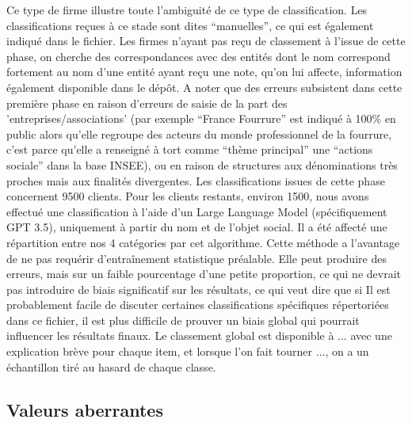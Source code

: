 \documentclass[a4paper,12pt]{article}
\begin{document}
 Ce type de firme illustre toute l'ambiguité de ce type de classification.  Les classifications re\c cues à ce stade sont dites ``manuelles'', ce qui est également indiqué dans le fichier. Les firmes n'ayant pas re\c cu de classement à l'issue de cette phase, on cherche des correspondances avec des entités dont le nom correspond fortement au nom d'une entité ayant re\c cu une note, qu'on lui affecte, information également disponible dans le dép\^ot. A noter que des erreurs subsistent dans cette première phase en raison d'erreurs de saisie de la part des 'entreprises/associations' (par exemple “France Fourrure” est indiqué à 100\% en public alors qu’elle regroupe des acteurs du monde professionnel de la fourrure, c’est parce qu’elle a renseigné à tort comme “thème principal” une “actions sociale” dans la base INSEE), ou en raison de structures aux dénominations très proches mais aux finalités divergentes.
 Les classifications issues de cette phase concernent 9500 clients. Pour les clients restants, environ 1500,  nous avons effectué une classification à l'aide d'un Large Language Model (spécifiquement GPT 3.5), uniquement à partir du nom et de l'objet social. Il a été affecté une répartition entre nos 4 catégories par cet algorithme. Cette méthode  a l'avantage de ne pas requérir d'entra\^inement statistique préalable. Elle peut produire des erreurs, mais sur un faible pourcentage d'une petite proportion, ce qui ne devrait pas introduire de biais significatif sur les résultats, ce qui veut dire que si Il est probablement facile de discuter certaines classifications spécifiques répertoriées dans ce fichier,  il est plus difficile de prouver un biais global qui pourrait influencer les résultats finaux. 
 Le classement global est disponible à ... avec une explication brève pour chaque item, et lorsque l'on fait tourner ..., on a un échantillon tiré au hasard de chaque classe.
  

\subsection{Valeurs aberrantes}  
\end{document}
